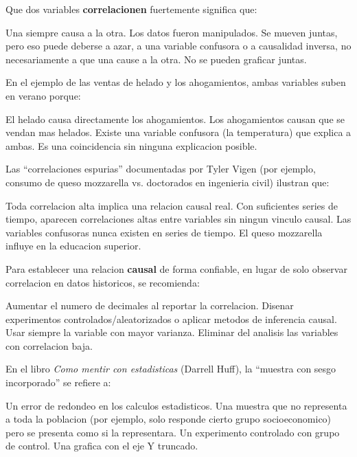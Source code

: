 \documentclass[12pt,addpoints]{exam}
\begin{document}
\begin{questions}
\question[1] Que dos variables \textbf{correlacionen} fuertemente significa
que:
\begin{choices}
  \choice Una siempre causa a la otra.
  \choice Los datos fueron manipulados.
  \CorrectChoice Se mueven juntas, pero eso puede deberse a azar, a una
    variable confusora o a causalidad inversa, no necesariamente a que una
    cause a la otra.
  \choice No se pueden graficar juntas.
\end{choices}

\question[1] En el ejemplo de las ventas de helado y los ahogamientos, ambas
variables suben en verano porque:
\begin{choices}
  \choice El helado causa directamente los ahogamientos.
  \choice Los ahogamientos causan que se vendan mas helados.
  \CorrectChoice Existe una variable confusora (la temperatura) que explica a
    ambas.
  \choice Es una coincidencia sin ninguna explicacion posible.
\end{choices}

\question[1] Las ``correlaciones espurias'' documentadas por Tyler Vigen
(por ejemplo, consumo de queso mozzarella vs. doctorados en ingenieria
civil) ilustran que:
\begin{choices}
  \choice Toda correlacion alta implica una relacion causal real.
  \CorrectChoice Con suficientes series de tiempo, aparecen correlaciones
    altas entre variables sin ningun vinculo causal.
  \choice Las variables confusoras nunca existen en series de tiempo.
  \choice El queso mozzarella influye en la educacion superior.
\end{choices}

\question[1] Para establecer una relacion \textbf{causal} de forma confiable,
en lugar de solo observar correlacion en datos historicos, se recomienda:
\begin{choices}
  \choice Aumentar el numero de decimales al reportar la correlacion.
  \CorrectChoice Disenar experimentos controlados/aleatorizados o aplicar
    metodos de inferencia causal.
  \choice Usar siempre la variable con mayor varianza.
  \choice Eliminar del analisis las variables con correlacion baja.
\end{choices}

\question[1] En el libro \emph{Como mentir con estadisticas} (Darrell Huff),
la ``muestra con sesgo incorporado'' se refiere a:
\begin{choices}
  \choice Un error de redondeo en los calculos estadisticos.
  \CorrectChoice Una muestra que no representa a toda la poblacion (por
    ejemplo, solo responde cierto grupo socioeconomico) pero se presenta
    como si la representara.
  \choice Un experimento controlado con grupo de control.
  \choice Una grafica con el eje Y truncado.
\end{choices}


\end{questions}
\end{document}
